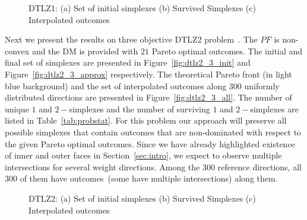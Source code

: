 \begin{figure*}[!ht]
	\centering
	\caption{DTLZ1: (a) Set of initial {\color{blue}simplexes} (b) Survived {\color{blue}Simplexes} (c) Interpolated outcomes}
	\label{fig:dtlz1_3_true_approx}
\end{figure*}

Next we present the results on three objective DTLZ2 problem~\cite{deb2002scalable}. The $PF$ is non-convex and the DM is provided with $21$ Pareto optimal outcomes. The initial and final set of {\color{blue}simplexes} are presented in Figure~\ref{fig:dtlz2_3_init} and Figure~\ref{fig:dtlz2_3_approx} respectively. The theoretical Pareto front (in light blue background) and the set of interpolated outcomes along $300$ uniformly distributed directions are presented in Figure~\ref{fig:dtlz2_3_all}. The number of unique $1$ and $2-${\color{blue}simplexes} and the number of surviving $1$ and $2-${\color{blue}simplexes} are listed in Table~\ref{tab:probstat}. For this problem our approach will preserve all possible {\color{blue}simplexes} that contain outcomes that are non-dominated with respect to the given Pareto optimal outcomes. Since we have already highlighted existence of inner and outer faces in Section~\ref{sec:intro}, we expect to observe multiple intersections for several weight directions. Among the 300 reference directions, all 300 of them have  outcomes~(some have multiple intersections) along them. 

\begin{figure*}[!ht]
	\centering
	\caption{DTLZ2: (a) Set of initial {\color{blue}simplexes} (b) Survived {\color{blue}Simplexes} (c) Interpolated outcomes}
	\label{fig:dtlz2_3_true_approx}
\end{figure*}


